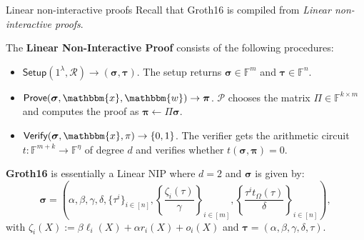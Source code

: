 \documentclass{zkdl-presentation-template}
\begin{document}
    \begin{frame}{Linear non-interactive proofs}
        Recall that Groth16 is compiled from \textit{Linear non-interactive proofs}.
        \begin{definition}
            The \textbf{Linear Non-Interactive Proof} consists of the following procedures:
            \begin{itemize}
                \item $\textsf{Setup}(1^{\lambda}, \mathcal{R}) \to (\boldsymbol{\sigma},\boldsymbol{\tau})$. The setup 
                returns $\boldsymbol{\sigma} \in \mathbb{F}^m$ and $\boldsymbol{\tau} \in \mathbb{F}^n$. 
                \item $\textsf{Prove}(\boldsymbol{\sigma}, \mathbbm{x},
                \mathbbm{w}) \to \boldsymbol{\pi}$. $\mathcal{P}$ chooses the
                matrix $\Pi \in \mathbb{F}^{k \times m}$ and computes the proof
                as $\boldsymbol{\pi} \gets \Pi \boldsymbol{\sigma}$.
                \item $\textsf{Verify}(\boldsymbol{\sigma}, \mathbbm{x}, \pi)\to\{0,1\}$.
                The verifier gets the arithmetic circuit $t: \mathbb{F}^{m+k}
                \to \mathbb{F}^{\eta}$ of degree $d$ and verifies whether
                $t(\boldsymbol{\sigma},\boldsymbol{\pi}) = 0$.
            \end{itemize}
        \end{definition}
        \vspace{-10px}

        \textbf{Groth16} is essentially a Linear NIP where $d=2$ and
        $\boldsymbol{\sigma}$ is given by:
        \begin{equation*}
            \boldsymbol{\sigma} = \left(\alpha,\beta,\gamma,\delta,\{\tau^i\}_{i \in [n]}, \left\{\frac{\zeta_i(\tau)}{\gamma}\right\}_{i \in [m]}, \left\{\frac{\tau^it_{\Omega}(\tau)}{\delta}\right\}_{i \in [n]}\right),
        \end{equation*}
        with $\zeta_i(X) := \beta \ell_i(X) + \alpha r_i(X) + o_i(X)$ and
        $\boldsymbol{\tau} = (\alpha,\beta,\gamma,\delta,\tau)$.
    \end{frame}
\end{document}
